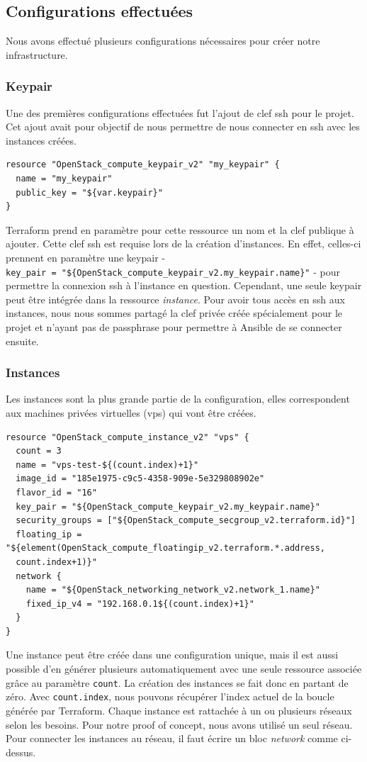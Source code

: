 \documentclass[]{article}
\begin{document}
\subsection{Configurations
effectuées}\label{configurations-effectuuxe9es}
Nous avons effectué plusieurs configurations nécessaires pour créer notre infrastructure.
\subsubsection{Keypair}\label{keypair}
Une des premières configurations effectuées fut l'ajout de clef ssh pour
le projet. Cet ajout avait pour objectif de nous permettre de nous
connecter en ssh avec les instances créées.

\begin{verbatim}
resource "OpenStack_compute_keypair_v2" "my_keypair" {
  name = "my_keypair"
  public_key = "${var.keypair}"
}
\end{verbatim}

Terraform prend en paramètre pour cette ressource un nom et la clef
publique à ajouter. Cette clef ssh est requise lors de la création
d'instances. En effet, celles-ci prennent en paramètre une keypair -
\texttt{key\_pair\ =\ "\$\{OpenStack\_compute\_keypair\_v2.my\_keypair.name\}"}
- pour permettre la connexion ssh à l'instance en question. Cependant,
une seule keypair peut être intégrée dans la ressource \emph{instance}.
Pour avoir tous accès en ssh aux instances, nous nous sommes partagé la
clef privée créée spécialement pour le projet et n'ayant pas de
passphrase pour permettre à Ansible de se connecter ensuite.

\subsubsection{Instances}\label{instances}
Les instances sont la plus grande partie de la configuration, elles
correspondent aux machines privées virtuelles (vps) qui vont être créées.
\begin{verbatim}
resource "OpenStack_compute_instance_v2" "vps" {
  count = 3
  name = "vps-test-${(count.index)+1}"
  image_id = "185e1975-c9c5-4358-909e-5e329808902e"
  flavor_id = "16"
  key_pair = "${OpenStack_compute_keypair_v2.my_keypair.name}"
  security_groups = ["${OpenStack_compute_secgroup_v2.terraform.id}"]
  floating_ip = "${element(OpenStack_compute_floatingip_v2.terraform.*.address,
  count.index+1)}"
  network {
    name = "${OpenStack_networking_network_v2.network_1.name}"
    fixed_ip_v4 = "192.168.0.1${(count.index)+1}"
  }
}
\end{verbatim}
Une instance peut être créée dans une configuration unique, mais il est aussi possible d'en générer plusieurs automatiquement avec une seule ressource associée grâce au paramètre \texttt{count}.
La création des instances se fait donc en partant de zéro. Avec \texttt{count.index}, nous pouvons récupérer l'index actuel de la boucle générée par Terraform. Chaque instance est rattachée à un ou plusieurs réseaux selon les besoins. Pour notre proof of concept, nous avons utilisé un seul réseau. Pour connecter les instances au réseau, il faut écrire un bloc \textit{network} comme ci-dessus.
\end{document}
